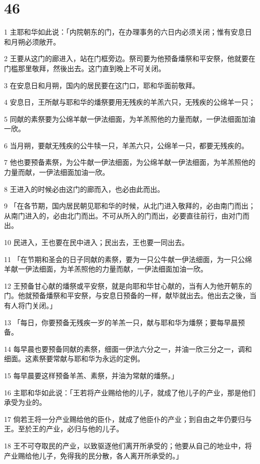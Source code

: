 \chapter{46}

\par 1 主耶和华如此说：「内院朝东的门，在办理事务的六日内必须关闭；惟有安息日和月朔必须敞开。
\par 2 王要从这门的廊进入，站在门框旁边。祭司要为他预备燔祭和平安祭，他就要在门槛那里敬拜，然後出去。这门直到晚上不可关闭。
\par 3 在安息日和月朔，国内的居民要在这门口，耶和华面前敬拜。
\par 4 安息日，王所献与耶和华的燔祭要用无残疾的羊羔六只，无残疾的公绵羊一只；
\par 5 同献的素祭要为公绵羊献一伊法细面，为羊羔照他的力量而献，一伊法细面加油一欣。
\par 6 当月朔，要献无残疾的公牛犊一只，羊羔六只，公绵羊一只，都要无残疾的。
\par 7 他也要预备素祭，为公牛献一伊法细面，为公绵羊献一伊法细面，为羊羔照他的力量而献，一伊法细面加油一欣。
\par 8 王进入的时候必由这门的廊而入，也必由此而出。
\par 9 「在各节期，国内居民朝见耶和华的时候，从北门进入敬拜的，必由南门而出；从南门进入的，必由北门而出。不可从所入的门而出，必要直往前行，由对门而出。
\par 10 民进入，王也要在民中进入；民出去，王也要一同出去。
\par 11 「在节期和圣会的日子同献的素祭，要为一只公牛献一伊法细面，为一只公绵羊献一伊法细面，为羊羔照他的力量而献，一伊法细面加油一欣。
\par 12 王预备甘心献的燔祭或平安祭，就是向耶和华甘心献的，当有人为他开朝东的门。他就预备燔祭和平安祭，与安息日预备的一样，献毕就出去。他出去之後，当有人将门关闭。」
\par 13 「每日，你要预备无残疾一岁的羊羔一只，献与耶和华为燔祭；要每早晨预备。
\par 14 每早晨也要预备同献的素祭，细面一伊法六分之一，并油一欣三分之一，调和细面。这素祭要常献与耶和华为永远的定例。
\par 15 每早晨要这样预备羊羔、素祭，并油为常献的燔祭。」
\par 16 主耶和华如此说：「王若将产业赐给他的儿子，就成了他儿子的产业，那是他们承受为业的。
\par 17 倘若王将一分产业赐给他的臣仆，就成了他臣仆的产业；到自由之年仍要归与王。至於王的产业，必归与他的儿子。
\par 18 王不可夺取民的产业，以致驱逐他们离开所承受的；他要从自己的地业中，将产业赐给他儿子，免得我的民分散，各人离开所承受的。」
